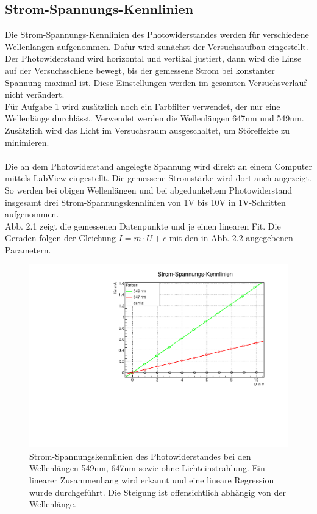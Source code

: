 \subsection{Strom-Spannungs-Kennlinien}


Die Strom-Spannungs-Kennlinien des Photowiderstandes werden für verschiedene Wellenlängen aufgenommen. Dafür wird zunächst der Versuchsaufbau eingestellt. Der Photowiderstand wird horizontal und vertikal justiert, dann wird die Linse auf der Versuchsschiene bewegt, bis der gemessene Strom bei konstanter Spannung maximal ist. Diese Einstellungen werden im gesamten Versuchsverlauf nicht verändert. \\
Für Aufgabe 1 wird zusätzlich noch ein Farbfilter verwendet, der nur eine Wellenlänge durchlässt. Verwendet werden die Wellenlängen 647nm und 549nm. Zusätzlich wird das Licht im Versuchsraum ausgeschaltet, um Störeffekte zu minimieren. \\
\\
Die an dem Photowiderstand angelegte Spannung wird direkt an einem Computer mittels LabView eingestellt. Die gemessene Stromstärke wird dort auch angezeigt. So werden bei obigen Wellenlängen und bei abgedunkeltem Photowiderstand insgesamt drei Strom-Spannungskennlinien von 1V bis 10V in 1V-Schritten aufgenommen. \\
Abb. 2.1 zeigt die gemessenen Datenpunkte und je einen linearen Fit. Die Geraden folgen der Gleichung $I = m \cdot U + c$ mit den in Abb. 2.2 angegebenen Parametern. \\

\begin{figure}[h]
\label{A1_reg}
\centering
\includegraphics[scale=0.5]{../A1/A1.pdf}
\caption{Strom-Spannungskennlinien des Photowiderstandes bei den Wellenlängen 549nm, 647nm sowie ohne Lichteinstrahlung. Ein linearer Zusammenhang wird erkannt und eine lineare Regression wurde durchgeführt. Die Steigung ist offensichtlich abhängig von der Wellenlänge.}
\end{figure}

